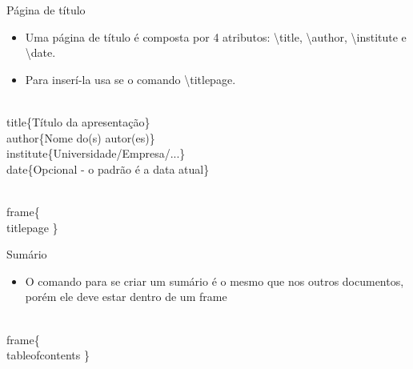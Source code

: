 \begin{frame}[fragile]{Página de título}
    \begin{itemize}
    \item Uma página de título é composta por 4 atributos: \alert{\textbackslash title}, \alert{\textbackslash author}, \alert{\textbackslash institute} e \alert{\textbackslash date}.
    \item Para inserí-la usa se o comando \alert{\textbackslash titlepage}.
    \end{itemize}

    \begin{example}
    \begin{semiverbatim}
\\title\{Título da apresentação\}
\\author\{Nome do(s) autor(es)\}
\\institute\{Universidade/Empresa/...\}
\\date\{Opcional - o padrão é a data atual\}

\\frame\{
    \\titlepage
    \}
    \end{semiverbatim}
    \end{example}
\end{frame}

\begin{frame}[fragile]{Sumário}
    \begin{itemize}
    \item O comando para se criar um sumário é o mesmo que nos outros documentos, porém ele deve estar dentro de um frame
    \end{itemize}

    \begin{example}
    \begin{semiverbatim}
\\frame\{
    \alert{\\tableofcontents}
    \}
    \end{semiverbatim}
    \end{example}
\end{frame}

